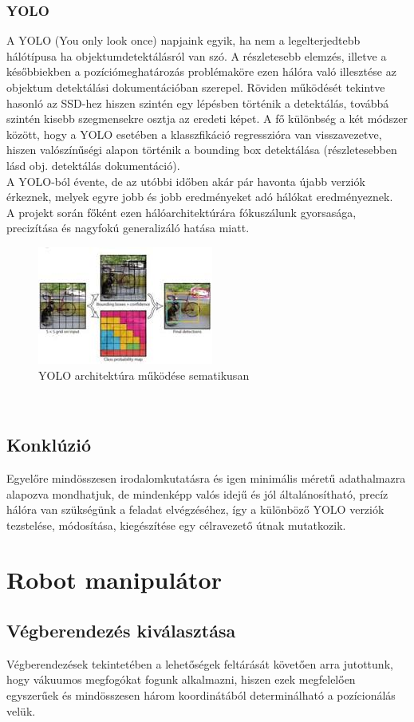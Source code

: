 \documentclass{article}
\begin{document}
\subsubsection{YOLO}
A YOLO (You only look once) napjaink egyik, ha nem a legelterjedtebb 
hálótípusa ha objektumdetektálásról van szó. A részletesebb elemzés, illetve 
a későbbiekben a pozíciómeghatározás problémaköre ezen hálóra való illesztése 
az objektum detektálási dokumentációban szerepel. Röviden működését tekintve 
hasonló az SSD-hez hiszen szintén egy lépésben történik a detektálás, továbbá
szintén kisebb szegmensekre osztja az eredeti képet. A fő különbség a két 
módszer között, hogy a YOLO esetében a klasszfikáció regresszióra van visszavezetve, 
hiszen valószínűségi alapon történik a bounding box detektálása (részletesebben lásd obj. detektálás dokumentáció).\\[5pt]
A YOLO-ból évente, de az utóbbi időben akár pár havonta újabb verziók 
érkeznek, melyek egyre jobb és jobb eredményeket adó hálókat eredményeznek.\\
A projekt során főként ezen hálóarchitektúrára fókuszálunk gyorsasága, precizítása 
és nagyfokú generalizáló hatása miatt.
\begin{figure}[h]
    \centering
    \includegraphics[scale=1]{yolo.jpg}
    \caption{YOLO architektúra működése sematikusan}
\end{figure}\\
\subsection{Konklúzió}
Egyelőre mindösszesen irodalomkutatásra és igen minimális méretű
adathalmazra alapozva mondhatjuk, de mindenképp valós idejű és jól 
általánosítható, precíz hálóra van szükségünk a feladat elvégzéséhez, így 
a különböző YOLO verziók tezstelése, módosítása, kiegészítése egy célravezető 
útnak mutatkozik.

\section{Robot manipulátor}
\subsection{Végberendezés kiválasztása}
Végberendezések tekintetében a lehetőségek feltárását követően 
arra jutottunk, hogy vákuumos megfogókat fogunk alkalmazni, 
hiszen ezek megfelelően egyszerűek és mindösszesen 
három koordinátából determinálható a pozícionálás velük.
\end{document}

